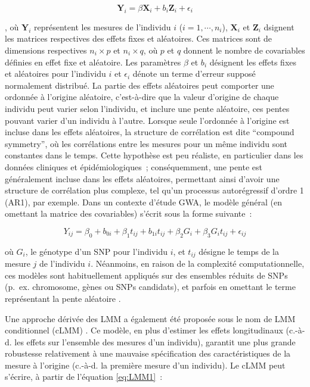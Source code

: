 \documentclass[11pt,a4paper,notrimn]{krantz}
\theoremstyle{definition}
\theoremstyle{definition}
\theoremstyle{remark}
\begin{document}
\begin{equation}\boldsymbol{Y}_i=\beta \boldsymbol{X}_i + b_i \boldsymbol{Z}_i + \epsilon_i\label{eq:LMM1}\end{equation}

, où \(\boldsymbol{Y}_i\) représentent les mesures de l'individu \(i\)
(\(i=1, \cdots, n_i\)), \(\boldsymbol{X}_i\) et \(\boldsymbol{Z}_i\)
dsignent les matrices respectives des effets fixes et aléatoires. Ces
matrices sont de dimensions respectives \(n_i\times p\) et
\(n_i\times q\), où \(p\) et \(q\) donnent le nombre de covariables
définies en effet fixe et aléatoire. Les paramètres \(\beta\) et \(b_i\)
désignent les effets fixes et aléatoires pour l'individu \(i\) et
\(\epsilon_i\) dénote un terme d'erreur supposé normalement distribué.
La partie des effets aléatoires peut comporter une ordonnée à l'origine
aléatoire, c'est-à-dire que la valeur d'origine de chaque individu peut
varier selon l'individu, et inclure une pente aléatoire, ces pentes
pouvant varier d'un individu à l'autre. Lorsque seule l'ordonnée à
l'origine est incluse dans les effets aléatoires, la structure de
corrélation est dite ``compound symmetry'', où les corrélations entre
les mesures pour un même individu sont constantes dans le temps. Cette
hypothèse est peu réaliste, en particulier dans les données cliniques et
épidémiologiques~; conséquemment, une pente est généralement incluse
dans les effets aléatoires, permettant ainsi d'avoir une structure de
corrélation plus complexe, tel qu'un processus autorégressif d'ordre 1
(AR1), par exemple. Dans un contexte d'étude GWA, le modèle général (en
omettant la matrice des covariables) s'écrit sous la forme suivante~:

\begin{equation}Y_{ij}=\beta_0+b_{0i}+\beta_1 t_{ij}+b_{1i} t_{ij}+\beta_2 G_i+\beta_3 G_i t_{ij}+\epsilon_{ij}\label{eq:LMM2}\end{equation}

où \(G_i\), le génotype d'un SNP pour l'individu \(i\), et \(t_{ij}\)
désigne le temps de la mesure \(j\) de l'individu \(i\). Néanmoins, en
raison de la complexité computationnelle, ces modèles sont
habituellement appliqués sur des ensembles réduits de SNPs (p.~ex.
chromosome, gènes ou SNPs candidats), et parfois en omettant le terme
représentant la pente aléatoire
\citep{hu_association_2014, wu_mixed-effects_2014, mei_longitudinal_2012, lee_analysis_2014, liu_penalized_2014, xu_longitudinal_2014, smith_longitudinal_2010}.

Une approche dérivée des LMM a également été proposée sous le nom de LMM
conditionnel (cLMM) \citep{verbeke_conditional_2001}. Ce modèle, en plus
d'estimer les effets longitudinaux (c.-à-d. les effets sur l'ensemble
des mesures d'un individu), garantit une plus grande robustesse
relativement à une mauvaise spécification des caractéristiques de la
mesure à l'origine (c.-à-d. la première mesure d'un individu). Le cLMM
peut s'écrire, à partir de l'équation \eqref{eq:LMM1}~:
\end{document}

